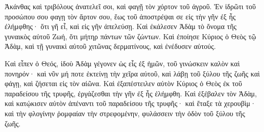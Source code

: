 {Ἀκάνθας καὶ τριβόλους ἀνατελεῖ σοι, καὶ φαγῇ τὸν χόρτον τοῦ ἀγροῦ.
Ἐν ἱδρῶτι τοῦ προσώπου σου φαγῃ τὸν ἄρτον σου, ἕως τοῦ ἀποστρέψαι σε εἰς τὴν γῆν ἐξ ἧς ἐλήμφθης· ὅτι γῆ εἶ, καὶ εἰς γῆν ἀπελεύσῃ.
Καὶ ἐκάλεσεν Ἀδὰμ τὸ ὄνομα τῆς γυναικὸς αὐτοῦ Ζωή, ὅτι μήτηρ πάντων τῶν ζώντων.
Καὶ ἐποίησε Κύριος ὁ Θεὸς τῷ Ἀδὰμ, καὶ τῇ γυναικὶ αὐτοῦ χιτῶνας δερματίνους, καὶ ἐνέδυσεν αὐτούς.
\par }{\PP {}Καὶ εἶπεν ὁ Θεός, ἰδοὺ Ἀδὰμ γέγονεν ὡς εἷς ἐξ ἡμῶν, τοῦ γινώσκειν καλὸν καὶ πονηρόν· καὶ νῦν μή ποτε ἐκτείνῃ τὴν χεῖρα αὐτοῦ, καὶ λάβῃ τοῦ ξύλου τῆς ζωῆς καὶ φάγῃ, καὶ ζήσεται εἰς τὸν αἰῶνα.
Καὶ ἐξαπέστειλεν αὐτὸν Κύριος ὁ Θεὸς ἐκ τοῦ παραδείσου τῆς τρυφῆς, ἐργάζεσθαι τὴν γῆν ἐξ ἧς ἐλήμφθη.
Καὶ ἐξέβαλεν τὸν Ἀδὰμ, καὶ κατῴκισεν αὐτὸν ἀπέναντι τοῦ παραδείσου τῆς τρυφῆς· καὶ ἔταξε τὰ χερουβὶμ· καὶ τὴν φλογίνην ῥομφαίαν τὴν στρεφομένην, φυλάσσειν τὴν ὁδὸν τοῦ ξύλου τῆς ζωῆς.

}
